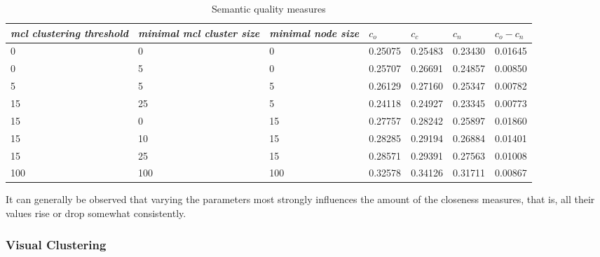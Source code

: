 \begin{table}[h]
    \begin{tabular}{| p{2.2cm} | p{2.2cm} | p{2cm} || p{1.4cm} | p{1.4cm} | p{1.4cm} | p{1.4cm} |}
	\hline    
    \emph{mcl clustering threshold} & \emph{minimal mcl cluster size}		& \emph{minimal node size} & $c_o $ & $c_c$ & $c_n$ & $c_o-c_n$ \\ \hline
    0 	& 0 	& 0 & 0.25075 & 0.25483 & 0.23430 & 0.01645 \\ \hline
    0 	& 5 	& 0 & 0.25707 & 0.26691 & 0.24857 & 0.00850 \\ \hline
    5 	& 5 	& 5 & 0.26129 & 0.27160 & 0.25347 & 0.00782 \\ \hline     
    15 	& 25 &  5 & 0.24118 & 0.24927 & 0.23345 & 0.00773\\ \hline
    15 	& 0 & 15 & 0.27757 & 0.28242 & 0.25897 & 0.01860 \\ \hline
    15 	& 10 & 15 & 0.28285 & 0.29194 & 0.26884 & 0.01401 \\ \hline
    15 	& 25 & 15 & 0.28571 & 0.29391 & 0.27563 & 0.01008 \\ \hline
    	100 	& 100 & 100 & 0.32578 & 0.34126 & 0.31711 & 0.00867 \\ \hline
    \end{tabular}
    \caption{Semantic quality measures}
	\label{tab_treeevaluation}
\end{table}

It can generally be observed that varying the parameters most strongly influences the amount of the closeness measures, that is, all their values rise or drop somewhat consistently.
 
\subsubsection*{Visual Clustering}


